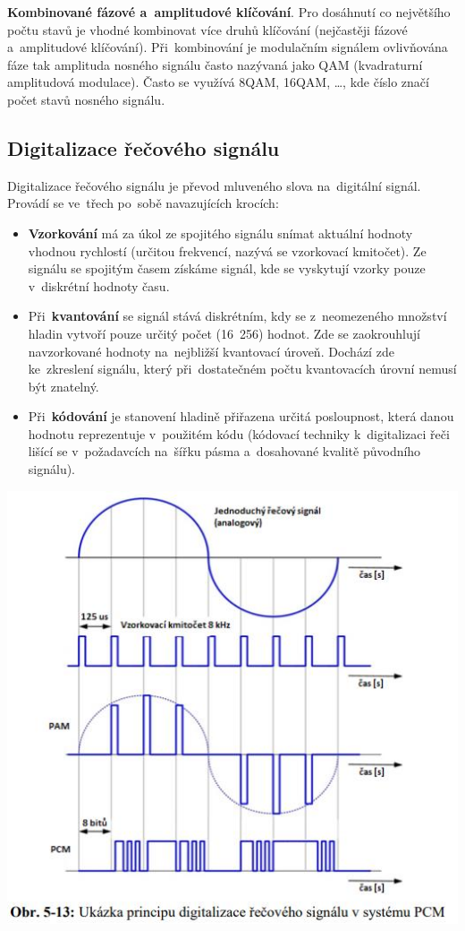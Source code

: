 \textbf{Kombinované fázové a~amplitudové klíčování}. Pro dosáhnutí co největšího počtu stavů je vhodné kombinovat více druhů klíčování (nejčastěji fázové a~amplitudové klíčování). Při~kombinování je modulačním signálem ovlivňována fáze tak amplituda nosného signálu často nazývaná jako QAM (kvadraturní amplitudová modulace). Často se využívá 8QAM, 16QAM, \dots, kde číslo značí počet stavů nosného signálu.

\subsection{Digitalizace řečového signálu}

Digitalizace řečového signálu je převod mluveného slova na~digitální signál. Provádí se ve~třech po~sobě navazujících krocích:

\begin{itemize}[noitemsep]
    \item \textbf{Vzorkování} má za úkol ze spojitého signálu snímat aktuální hodnoty vhodnou rychlostí (určitou frekvencí, nazývá se vzorkovací kmitočet). Ze signálu se spojitým časem získáme signál, kde se vyskytují vzorky pouze v~diskrétní hodnoty času.
    \item Při~\textbf{kvantování} se signál stává diskrétním, kdy se z~neomezeného množství hladin vytvoří pouze určitý počet (16~256) hodnot. Zde se zaokrouhlují navzorkované hodnoty na~nejbližší kvantovací úroveň. Dochází zde ke~zkreslení signálu, který při~dostatečném počtu kvantovacích úrovní nemusí být znatelný.
    \item Při~\textbf{kódování} je stanovení hladině přiřazena určitá posloupnost, která danou hodnotu reprezentuje v~použitém kódu (kódovací techniky k~digitalizaci řeči lišící se v~požadavcích na~šířku pásma a~dosahované kvalitě původního signálu).
\end{itemize}

\begin{center}
    \includegraphics[scale=0.75]{images/-022.jpg}
\end{center}

